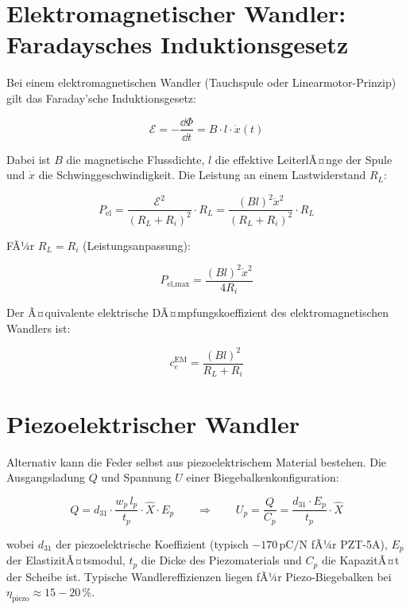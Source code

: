 ﻿\documentclass[12pt, a4paper]{report}
\theoremstyle{definition}
\theoremstyle{remark}
\begin{document}
\section{Elektromagnetischer Wandler: Faradaysches Induktionsgesetz}

Bei einem elektromagnetischen Wandler (Tauchspule oder Linearmotor-Prinzip)
gilt das Faraday'sche Induktionsgesetz:

\begin{equation}
  \mathcal{E} = -\frac{\dd\Phi}{\dd t} = B \cdot l \cdot \dot{x}(t)
  \label{eq:emk}
\end{equation}

Dabei ist $B$ die magnetische Flussdichte, $l$ die effektive LeiterlÃ¤nge der
Spule und $\dot{x}$ die Schwinggeschwindigkeit. Die Leistung an einem
Lastwiderstand $R_L$:

\begin{equation}
  P_{\text{el}} = \frac{\mathcal{E}^2}{(R_L + R_i)^2} \cdot R_L
  = \frac{(Bl)^2 \dot{x}^2}{(R_L + R_i)^2} \cdot R_L
  \label{eq:p_el_em}
\end{equation}

FÃ¼r $R_L = R_i$ (Leistungsanpassung):

\begin{equation}
  P_{\text{el,max}} = \frac{(Bl)^2 \dot{x}^2}{4 R_i}
  \label{eq:p_el_em_max}
\end{equation}

Der Ã¤quivalente elektrische DÃ¤mpfungskoeffizient des elektromagnetischen
Wandlers ist:

\begin{equation}
  c_e^{\text{EM}} = \frac{(Bl)^2}{R_L + R_i}
  \label{eq:ce_em}
\end{equation}

\section{Piezoelektrischer Wandler}

Alternativ kann die Feder selbst aus piezoelektrischem Material bestehen.
Die Ausgangsladung $Q$ und Spannung $U$ einer Biegebalkenkonfiguration:

\begin{equation}
  Q = d_{31} \cdot \frac{w_p \, l_p}{t_p} \cdot \hat{X} \cdot E_p
  \qquad \Rightarrow \qquad
  U_p = \frac{Q}{C_p} = \frac{d_{31} \cdot E_p}{t_p} \cdot \hat{X}
  \label{eq:piezo_spannung}
\end{equation}

wobei $d_{31}$ der piezoelektrische Koeffizient (typisch $-170\,\text{pC/N}$
fÃ¼r PZT-5A), $E_p$ der ElastizitÃ¤tsmodul, $t_p$ die Dicke des Piezomaterials
und $C_p$ die KapazitÃ¤t der Scheibe ist. Typische Wandlereffizienzen liegen
fÃ¼r Piezo-Biegebalken bei $\eta_{\text{piezo}} \approx 15-20\,\%$.
\end{document}
